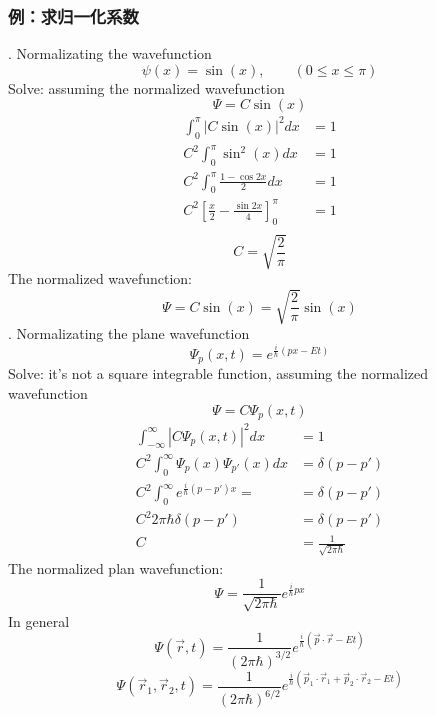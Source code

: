 \begin{frame}[allowframebreaks=]
    \frametitle{例：求归一化系数}
    . Normalizating the wavefunction \[\psi(x)=\sin(x), \qquad (0\le x \le \pi)\]
    \alert{Solve:} assuming the normalized wavefunction 
    \[\Psi=C\sin(x)\]
    \begin{equation*}
        \begin{split}
            \int_0 ^\pi |C\sin(x)|^2 dx &=1 \\
            C^2 \int_0 ^\pi \sin^2(x) dx &=1 \\
            C^2 \int_0 ^\pi \frac{1-\cos 2x }{2} dx &=1 \\ 
            C^2 [\frac{x}{2}-\frac{\sin 2x}{4}]_0 ^\pi &=1 \\ 
        \end{split} 
     \end{equation*}
     \[C=\sqrt{\frac{2}{\pi}}\]
     The normalized wavefunction:
     \begin{equation*}
        \Psi=C\sin(x)=\sqrt{\frac{2}{\pi}}\sin(x)
    \end{equation*}
    . Normalizating the plane wavefunction \[\Psi_p (x,t)=e^{\frac{i}{\hbar}(px-Et)} \] 
    \alert{Solve:} it's not a square integrable function, assuming the normalized wavefunction 
    \[\Psi=C\Psi_p (x,t)\]
    \begin{equation*}
        \begin{split}
            \int_{-\infty} ^\infty |C\Psi_p (x,t)|^2 dx &=1  \\
            C^2 \int_0 ^\infty \Psi_p (x) \Psi_{p'} (x) dx &=\delta (p-p')  \\
            C^2 \int_0 ^\infty e^{\frac{i}{\hbar}(p-p')x} =&=\delta (p-p')\\
            C^2 2\pi \hbar \delta (p-p') &=\delta(p-p') \\
            C&= \frac{1}{\sqrt{2\pi \hbar}}
        \end{split} 
     \end{equation*}
     The normalized plan wavefunction:
     \begin{equation*}
        \Psi=\frac{1}{\sqrt{2\pi \hbar}} e^{\frac{i}{\hbar}px}
    \end{equation*}  
    In general
    $$ \Psi(\vec r ,t)=\frac{1}{(2\pi \hbar)^{3/2}} e^{\frac{i}{\hbar}(\vec p\cdot \vec r -Et)} $$
    $$ \Psi(\vec r_1 ,\vec r_2, t)=\frac{1}{(2\pi \hbar)^{6/2}} e^{\frac{i}{\hbar}(\vec p_1 \cdot \vec r_1 +\vec p_2 \cdot \vec r_2 -Et)} $$
\end{frame}

